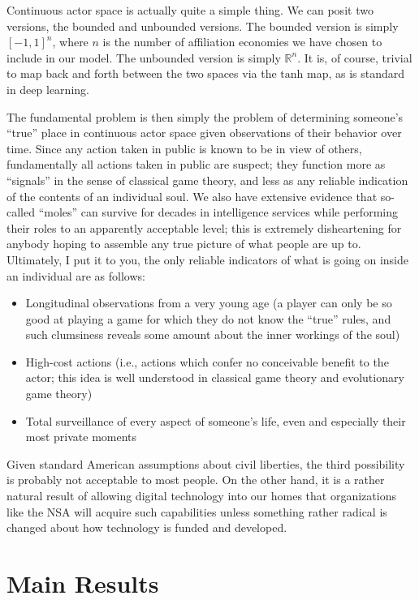 \documentclass{article}
\begin{document}
Continuous actor space is actually quite a simple thing. We can posit
two versions, the bounded and unbounded versions. The bounded version
is simply $[-1, 1]^n$, where $n$ is the number of affiliation
economies we have chosen to include in our model. The unbounded
version is simply $\mathbb{R}^n$. It is, of course, trivial to map
back and forth between the two spaces via the $\mathrm{tanh}$ map, as
is standard in deep learning.

The fundamental problem is then simply the problem of determining
someone's ``true'' place in continuous actor space given observations
of their behavior over time. Since any action taken in public is known
to be in view of others, fundamentally all actions taken in public are
suspect; they function more as ``signals'' in the sense of classical
game theory, and less as any reliable indication of the contents of an
individual soul. We also have extensive evidence that so-called
``moles'' can survive for decades in intelligence services while
performing their roles to an apparently acceptable level; this is
extremely disheartening for anybody hoping to assemble any true
picture of what people are up to. Ultimately, I put it to you, the
only reliable indicators of what is going on inside an individual are as follows:
\begin{itemize}
  \item Longitudinal observations from a very young age (a player can
    only be so good at playing a game for which they do not know the
    ``true'' rules, and such clumsiness reveals some amount about the
    inner workings of the soul)
  \item High-cost actions (i.e., actions which confer no conceivable
    benefit to the actor; this idea is well understood in classical
    game theory and evolutionary game theory)
  \item Total surveillance of every aspect of someone's life, even and
    especially their most private moments
\end{itemize}
Given standard American assumptions about civil liberties, the third
possibility is probably not acceptable to most people. On the other
hand, it is a rather natural result of allowing digital technology
into our homes that organizations like the NSA will acquire such
capabilities unless something rather radical is changed about how
technology is funded and developed.

\section{Main Results}
\end{document}
